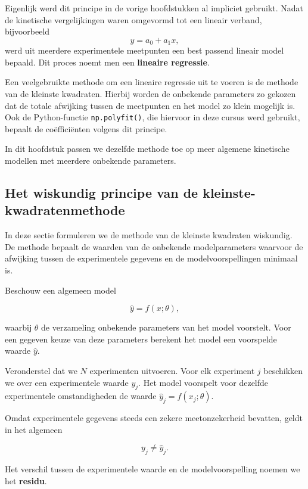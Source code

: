 \documentclass{ximera}
\begin{document}
\begin{remark}  \text{ }

Eigenlijk werd dit principe in de vorige hoofdstukken al impliciet gebruikt. Nadat de kinetische vergelijkingen waren omgevormd tot een lineair verband, bijvoorbeeld
\[y=a_0+a_1x,\]
werd uit meerdere experimentele meetpunten een best passend lineair model bepaald. Dit proces noemt men een \textbf{lineaire regressie}.

Een veelgebruikte methode om een lineaire regressie uit te voeren is de methode van de kleinste kwadraten. Hierbij worden de onbekende parameters zo gekozen dat de totale afwijking tussen de meetpunten en het model zo klein mogelijk is. Ook de Python-functie \texttt{np.polyfit()}, die hiervoor in deze cursus werd gebruikt, bepaalt de coëfficiënten volgens dit principe.

In dit hoofdstuk passen we dezelfde methode toe op meer algemene kinetische modellen met meerdere onbekende parameters.
\end{remark}

\subsection*{Het wiskundig principe van de kleinste-kwadratenmethode}

In deze sectie formuleren we de methode van de kleinste kwadraten wiskundig.
De methode bepaalt de waarden van de onbekende modelparameters waarvoor de
afwijking tussen de experimentele gegevens en de modelvoorspellingen minimaal
is.

Beschouw een algemeen model

\[
\hat{y}=f(x;\theta),
\]

waarbij $\theta$ de verzameling onbekende parameters van het model voorstelt.
Voor een gegeven keuze van deze parameters berekent het model een voorspelde
waarde $\hat{y}$.

Veronderstel dat we $N$ experimenten uitvoeren. Voor elk experiment $j$
beschikken we over een experimentele waarde $y_j$. Het model voorspelt voor
dezelfde experimentele omstandigheden de waarde $\hat{y}_j=f(x_j;\theta)$.

Omdat experimentele gegevens steeds een zekere meetonzekerheid bevatten, geldt
in het algemeen

\[
y_j\neq \hat{y}_j.
\]

Het verschil tussen de experimentele waarde en de modelvoorspelling noemen we
het \textbf{residu}.
\end{document}
